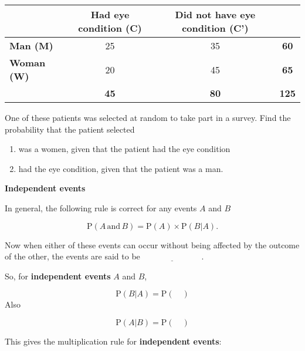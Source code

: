 \begin{enumerate}
\begin{table}[!htpb]
	\centering
	\begin{tabular}{l|c|c|c}
		\cline{2-3}
		& \textbf{Had eye condition (C)} & \textbf{Did not have eye condition (C')} &                                   \\ \hline
		\multicolumn{1}{|l|}{\textbf{Man (M)}}   & 25                             & 35                                       & \multicolumn{1}{c|}{\textbf{60}}  \\ \hline
		\multicolumn{1}{|l|}{\textbf{Woman (W)}} & 20                             & 45                                       & \multicolumn{1}{c|}{\textbf{65}}  \\ \hline
		& \textbf{45}                    & \textbf{80}                              & \multicolumn{1}{c|}{\textbf{125}} \\ \cline{2-4} 
	\end{tabular}
\end{table}

One of these  patients was selected at random to take part in a survey. Find the probability that the patient selected
\begin{enumerate}
	\item was a women, given that the patient had the eye condition
	\item had the eye condition, given that the patient was a man.
\end{enumerate}




\end{enumerate}

\newpage

\textbf{Independent events}

\medskip

In general, the following rule is correct for any events $A$ and $B$

\[
\text{P}(A \,\text{and}\, B) =  \text{P}(A) \times  \text{P}(B|A).
\]

Now when either of these events can occur without being affected by the outcome of the other,	the events 	are said to be $\underline{\hspace{3cm}}$.

\medskip

So, for \textbf{independent events} $A$ and $B$,

\[
 \text{P}(B|A) = \text{P}(\quad )
\] 
Also

\[
\text{P}(A|B) = \text{P}(\quad )
\]

This gives the multiplication rule for \textbf{independent events}:

